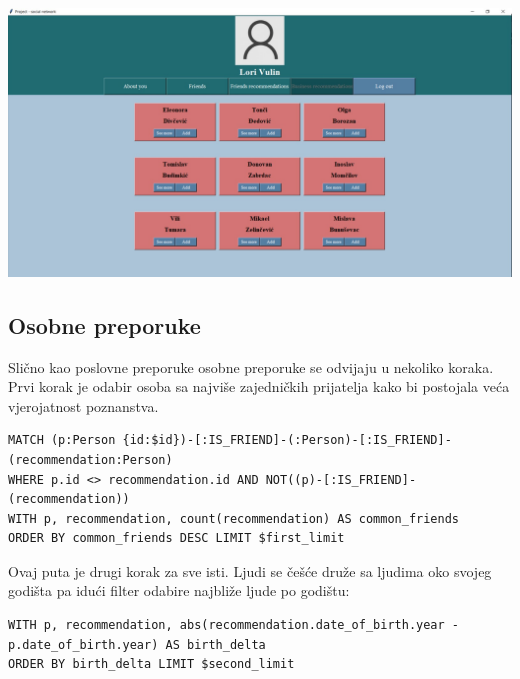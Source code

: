 \documentclass[titlepage, 12pt]{scrartcl}
\begin{document}
\begin{center}
    \includegraphics[scale=0.19]{slike/business.jpg}
\end{center}

\subsection{Osobne preporuke}
Slično kao poslovne preporuke osobne preporuke se odvijaju u nekoliko koraka. \\
Prvi korak je odabir osoba sa najviše zajedničkih prijatelja kako bi postojala veća vjerojatnost poznanstva.
\begin{samepage}
\begin{verbatim}
MATCH (p:Person {id:$id})-[:IS_FRIEND]-(:Person)-[:IS_FRIEND]-(recommendation:Person)
WHERE p.id <> recommendation.id AND NOT((p)-[:IS_FRIEND]-(recommendation))
WITH p, recommendation, count(recommendation) AS common_friends
ORDER BY common_friends DESC LIMIT $first_limit

\end{verbatim}
\end{samepage}
Ovaj puta je drugi korak za sve isti. Ljudi se češće druže sa ljudima oko svojeg godišta pa idući filter odabire najbliže ljude po godištu:
\begin{samepage}
\begin{verbatim}
WITH p, recommendation, abs(recommendation.date_of_birth.year - p.date_of_birth.year) AS birth_delta 
ORDER BY birth_delta LIMIT $second_limit

\end{verbatim}
\end{samepage}
\end{document}

